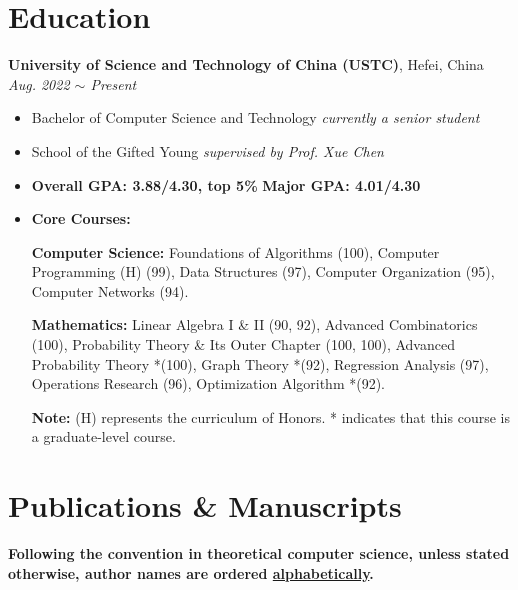 \documentclass[a4paper,12pt]{ctexart}
\begin{document}
\section{\textbf{Education}}
\textbf{University of Science and Technology of China (USTC)}, Hefei, China \hfill \textit{Aug. 2022 $\sim$ Present}  \vspace{-0.1cm}
\begin{itemize}
    \item Bachelor of Computer Science and Technology \hfill \textit{currently a senior student}  \vspace{-0.25cm}
    \item School of the Gifted Young \hfill \textit{supervised by Prof. Xue Chen}  \vspace{-0.25cm}
    \item \textbf{Overall GPA: 3.88/4.30, top 5\%} \hfill \textbf{Major GPA: 4.01/4.30}  \vspace{-0.25cm}
    \item \textbf{Core Courses:}  \vspace{-0.25cm}
    
          \textbf{Computer Science:} Foundations of Algorithms (100), Computer Programming (H) (99), Data Structures (97), Computer Organization (95), Computer Networks (94).  \vspace{-0.25cm}

          \textbf{Mathematics:} Linear Algebra I \& II (90, 92), Advanced Combinatorics (100), Probability Theory \& Its Outer Chapter (100, 100), Advanced Probability Theory *(100), Graph Theory *(92), Regression Analysis (97), Operations Research (96), Optimization Algorithm *(92).  \vspace{-0.25cm}

          \textbf{Note:} (H) represents the curriculum of Honors. * indicates that this course is a graduate-level course.
\end{itemize}



\section{\textbf{Publications \& Manuscripts}}

\textbf{Following the convention in theoretical computer science, unless stated otherwise, author names are ordered \underline{alphabetically}.}  \vspace{-0.1cm}
\end{document}
